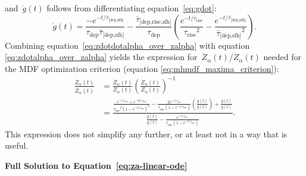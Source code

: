 \documentclass[12pt]{article}
\newcommand{\ddfrac}[2]{\frac{\displaystyle{#1}}{\displaystyle{#2}}}
\newcommand{\timescale}[1]{\ensuremath{\tau_\text{#1}}}
\newcommand{\harmonic}[2]{\ensuremath{\bar{\tau}_\text{[#1,#2]}}}
\newcommand{\hharmonic}[3]{\ensuremath{\bar{\tau}_\text{[#1,#2,#3]}}}
\begin{document}
and~$\ddot{g}(t)$ follows from differentiating equation~\ref{eq:gdot}:
\begin{equation}
\ddot{g}(t) = \frac{
	-e^{-t / \harmonic{dep}{sfh}}
}{
	\timescale{dep}\harmonic{dep}{sfh}
} - \frac{
	\hharmonic{dep}{rise}{sfh}
}{
	\timescale{dep}
} \left(\frac{
	e^{-t / \timescale{rise}}
}{
	\timescale{rise}^2
} - \frac{
	e^{-t / \harmonic{dep}{sfh}}
}{
	\harmonic{dep}{sfh}^2
}\right).
\label{eq:gdotdot}
\end{equation}
Combining equation~\ref{eq:zdotdotalpha_over_zalpha} with equation
\ref{eq:zdotalpha_over_zalpha} yields the expression for~$\ddot{Z}_\alpha(t) /
\dot{Z}_\alpha(t)$ needed for the MDF optimization criterion (equation
\ref{eq:mhmdf_maxima_criterion}):
\begin{subequations}\begin{align}
\frac{\ddot{Z}_\alpha(t)}{\dot{Z}_\alpha(t)} &=
\frac{\ddot{Z}_\alpha(t)}{Z_\alpha(t)}
\left(\frac{\dot{Z}_\alpha(t)}{Z_\alpha(t)}\right)^{-1}
\\
&= \ddfrac{
	\frac{
		e^{-t / \timescale{rise}} + e^{-2t / \timescale{rise}}
	}{
		\timescale{rise}^2 \left(1 - e^{-t / \timescale{rise}}\right)^2
	} - \frac{
		2 e^{-t / \timescale{rise}}
	}{
		\timescale{rise} \left(1 - e^{-t / \timescale{rise}}\right)
	} \left(\frac{\dot{g}(t)}{g(t)}\right) +
	\frac{\ddot{g}(t)}{g(t)}
}{
	\frac{\dot{g}(t)}{g(t)} - \frac{
		e^{-t / \timescale{rise}}
	}{
		\timescale{rise} \left(1 - e^{-t / \timescale{rise}}\right)
	}
}.
\label{eq:zdotdotalpha_over_zdotalpha}
\end{align}\end{subequations}
This expression does not simplify any further, or at least not in a way that is
useful.

















\newpage



\newpage
\noindent
\textbf{Full Solution to Equation~\ref{eq:za-linear-ode}}
\end{document}
